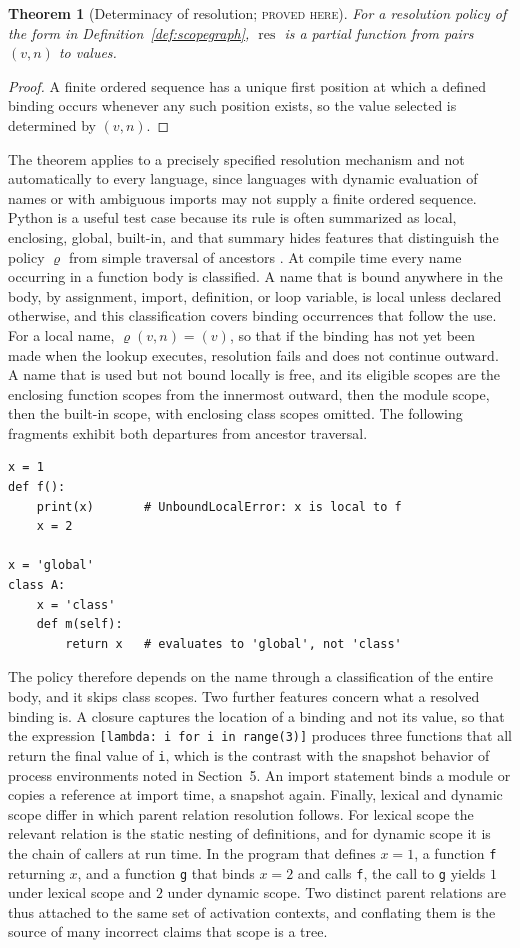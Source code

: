 \documentclass[11pt]{article}
\newtheorem{theorem}{Theorem}[section]
\theoremstyle{definition}
\theoremstyle{remark}
\newcommand{\stN}{\textsc{proved here}}
\newcommand{\res}{\operatorname{res}}
\begin{document}
\begin{theorem}[Determinacy of resolution; \stN]\label{thm:determinacy}
For a resolution policy of the form in Definition~\ref{def:scopegraph}, $\res$ is a partial function from pairs $(v,n)$ to values.
\end{theorem}
\begin{proof}
A finite ordered sequence has a unique first position at which a defined binding occurs whenever any such position exists, so the value selected is determined by $(v,n)$.
\end{proof}

The theorem applies to a precisely specified resolution mechanism and not automatically to every language, since languages with dynamic evaluation of names or with ambiguous imports may not supply a finite ordered sequence. Python is a useful test case because its rule is often summarized as local, enclosing, global, built-in, and that summary hides features that distinguish the policy $\varrho$ from simple traversal of ancestors \cite{pyref}. At compile time every name occurring in a function body is classified. A name that is bound anywhere in the body, by assignment, import, definition, or loop variable, is local unless declared otherwise, and this classification covers binding occurrences that follow the use. For a local name, $\varrho(v,n)=(v)$, so that if the binding has not yet been made when the lookup executes, resolution fails and does not continue outward. A name that is used but not bound locally is free, and its eligible scopes are the enclosing function scopes from the innermost outward, then the module scope, then the built-in scope, with enclosing class scopes omitted. The following fragments exhibit both departures from ancestor traversal.
\begin{verbatim}
x = 1
def f():
    print(x)       # UnboundLocalError: x is local to f
    x = 2

x = 'global'
class A:
    x = 'class'
    def m(self):
        return x   # evaluates to 'global', not 'class'
\end{verbatim}
The policy therefore depends on the name through a classification of the entire body, and it skips class scopes. Two further features concern what a resolved binding is. A closure captures the location of a binding and not its value, so that the expression \texttt{[lambda: i for i in range(3)]} produces three functions that all return the final value of \texttt{i}, which is the contrast with the snapshot behavior of process environments noted in Section~5. An import statement binds a module or copies a reference at import time, a snapshot again. Finally, lexical and dynamic scope differ in which parent relation resolution follows. For lexical scope the relevant relation is the static nesting of definitions, and for dynamic scope it is the chain of callers at run time. In the program that defines $x=1$, a function \texttt{f} returning $x$, and a function \texttt{g} that binds $x=2$ and calls \texttt{f}, the call to \texttt{g} yields $1$ under lexical scope and $2$ under dynamic scope. Two distinct parent relations are thus attached to the same set of activation contexts, and conflating them is the source of many incorrect claims that scope is a tree.
\end{document}

